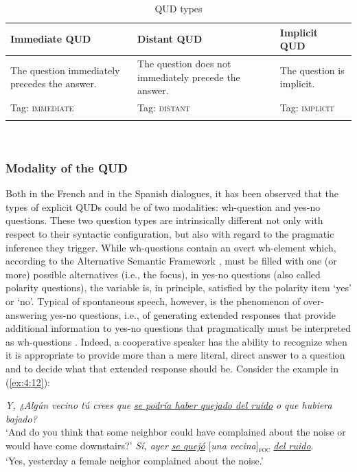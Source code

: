 \begin{table}
    
   \begin{tabularx}{\textwidth} {
   Q
   Q
     Q  }
 \lsptoprule
 \textbf{Immediate QUD} & \textbf{Distant QUD} & \textbf{Implicit QUD} \\
\midrule
\small The question immediately precedes the answer.  & \small The question does not immediately precede the answer. &  \small The question is implicit.  \\
\midrule
Tag: \small \textsc{immediate} & Tag: \small \textsc{distant} & Tag: \small \textsc{implicit} \\
\lspbottomrule
\end{tabularx}\\
    \caption{QUD types}
    \label{tab:5.3}
\end{table}

\subsubsection{Modality of the QUD}%

Both in the French and in the Spanish dialogues, it has been observed that the types of explicit QUDs could be of two modalities: wh-question and yes-no questions. These two question types are intrinsically different not only with respect to their syntactic configuration, but also with regard to the pragmatic inference they trigger. While wh-questions contain an overt wh-element which, according to the Alternative Semantic Framework \parencite{rooth1985association, rooth1992theory}, must be filled with one (or more) possible alternatives (i.e., the focus), in yes-no questions (also called polarity questions), the variable is, in principle, satisfied by the polarity item `yes' or `no'. 
Typical of spontaneous speech, however, is the phenomenon of over-answering yes-no questions, i.e., of generating extended responses that provide additional information to yes-no questions that pragmatically must be interpreted as wh-questions \parencite{wahlster1983over, steensig2013yes}. Indeed, a cooperative speaker has the ability to recognize when it is appropriate to provide more than a mere literal, direct answer to a question and to decide what that extended response should be.
Consider the example in (\ref{ex:4:12}):

\ea \label{ex:4:12}
\ea \textit{Y, ¿Algún vecino tú crees que} \uline{\textit{se podría haber quejado del ruido}} \textit{o que hubiera bajado?}\\
 ‘And do you think that some neighbor could have complained about the noise or would have come downstairs?'
\ex \textit{Sí, ayer} \uline{\textit{se quejó}} {[\textit{una vecina}]\textsubscript{\textsc{foc}}} \normalsize \uline{\textit{del ruido}}.\\
‘Yes, yesterday a female neighor complained about the noise.'

